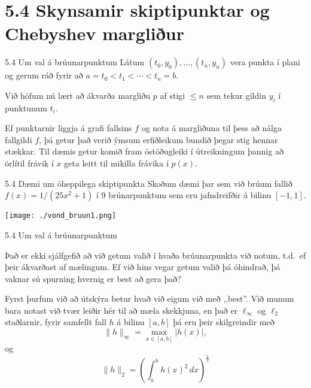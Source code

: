 \section*{5.4 Skynsamir skiptipunktar og Chebyshev margliður}
\begin{frame}{5.4 Um val á brúunarpunktum}
Látum $(t_0,y_0),\dots,(t_n,y_n)$ vera punkta í plani og gerum ráð
fyrir að $a=t_0<t_1<\cdots<t_n=b$. 

\pause
\smallskip
Við höfum nú lært að ákvarða
margliðu $p$ af stigi $\leq n$ sem tekur gildin $y_i$ í punktunum
$t_i$.  

\pause
\smallskip
Ef punktarnir liggja á grafi fallsins $f$ og nota á margliðuna
til þess að nálga fallgildi $f$, þá getur það verið ýmsum erfiðleikum
bundið þegar stig hennar stækkar. Til dæmis getur komið fram
óstöðugleiki í útreikningum þannig að örlítil frávik í $x$ geta leitt
til mikilla frávika í $p(x)$. 

\end{frame}

\begin{frame}{5.4 Dæmi um óheppilega skiptipunkta}
Skoðum dæmi þar sem við brúum fallið 
$f(x) = 1/(25x^2+1)$ í 9 brúnarpunktum sem eru jafndreifðir
á bilinu $[-1,1]$.

\begin{center}
 \texttt{[image: ./vond\_bruun1.png]}
\end{center}

\end{frame}

\begin{frame}{5.4 Um val á brúunarpunktum}
\begin{block}{}
 Það er ekki sjálfgefið að við getum valið í hvaða brúunarpunkta við notum, t.d.~ef þeir 
 ákvarðast af mælingum. \pause Ef við hins vegar getum valið þá óhindrað, þá vaknar sú spurning 
 hvernig er best að gera það?\pause
 
 Fyrst þurfum við að útskýra betur hvað við eigum við með ,,best''. \pause
 Við munum bara notast við tvær leiðir hér til að mæla skekkjuna, en það er 
 $\ell_\infty$ og $\ell_2$ staðlarnir, \pause fyrir samfellt fall 
 $h$ á bilinu $[a,b]$ þá eru þeir skilgreindir með 
 $$
  \|h\|_\infty  = \max_{x\in[a,b]} |h(x)|,
 $$
 \pause og
 $$
  \|h\|_2 = \left( \int_a^b h(x)^2\, dx \right)^\frac 12
 $$
\end{block}
\end{frame}
 
